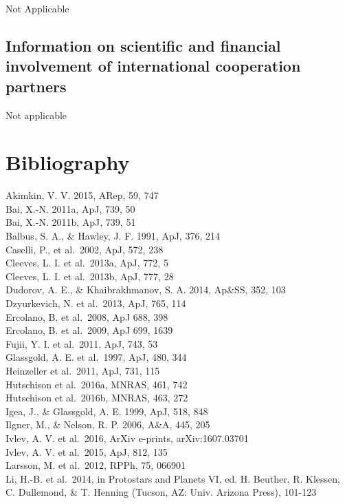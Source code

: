 \documentclass[10pt,fleqn,twoside]{article}
\begin{document}
Not Applicable 

\subsection{Information on scientific and financial involvement of international cooperation partners}

Not applicable 

\section{Bibliography}

\noindent
Akimkin, V. V. 2015, ARep, 59, 747 \\
Bai, X.-N. 2011a, ApJ, 739, 50 \\
Bai, X.-N. 2011b, ApJ, 739, 51 \\
Balbus, S. A., \& Hawley, J. F. 1991, ApJ, 376, 214 \\
Caselli, P., et al.\ 2002, ApJ, 572, 238 \\
Cleeves, L. I. et al.\ 2013a, ApJ, 772, 5 \\
Cleeves, L. I. et al.\ 2013b, ApJ, 777, 28 \\
Dudorov, A. E., \& Khaibrakhmanov, S. A. 2014, Ap\&SS, 352, 103 \\
Dzyurkevich, N. et al.\ 2013, ApJ, 765, 114 \\
Ercolano, B. et al.\ 2008, ApJ 688, 398 \\
Ercolano, B. et al.\ 2009, ApJ 699, 1639\\
Fujii, Y. I. et al.\ 2011, ApJ, 743, 53 \\
Glassgold, A. E. et al.\ 1997, ApJ, 480, 344 \\
Heinzeller et al.\ 2011, ApJ, 731, 115 \\
Hutschison et al.\ 2016a, MNRAS, 461, 742\\
Hutschison et al.\ 2016b, MNRAS, 463, 272\\ 
Igea, J., \& Glassgold, A. E. 1999, ApJ, 518, 848 \\
Ilgner, M., \& Nelson, R. P. 2006, A\&A, 445, 205 \\
Ivlev, A. V. et al.\ 2016, ArXiv e-prints, arXiv:1607.03701\\ 
Ivlev, A. V. et al.\  2015, ApJ, 812, 135 \\
Larsson, M. et al.\ 2012, RPPh, 75, 066901\\  
Li, H.-B. et al.\ 2014, in Protostars and Planets VI, ed. H. Beuther, R. Klessen, C. Dullemond, \& T. Henning (Tucson, AZ: Univ. Arizona Press), 101-123 \\
\end{document}
